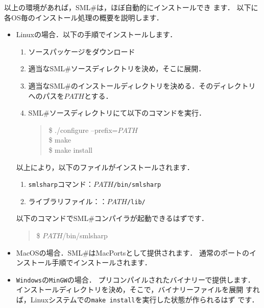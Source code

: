\documentclass{jbook}
\newcommand{\smlsharp}{SML\#}
\newenvironment{program}{\begin{tt}\begin{quote}}{\end{quote}\end{tt}}
\begin{document}
	以上の環境があれば，\smlsharp{}は，ほぼ自動的にインストールでき
ます．
	以下に各OS毎のインストール処理の概要を説明します．
\begin{itemize}
\item Linuxの場合．以下の手順でインストールします．
\begin{enumerate}
\item ソースパッケージをダウンロード
\item 適当な\smlsharp{}ソースディレクトリを決め，そこに展開．
\item 適当な\smlsharp{}のインストールディレクトリを決める．そのディレクトリへのパスを$PATH$とする．
\item \smlsharp{}ソースディレクトリにて以下のコマンドを実行．
\begin{program}
\$ ./configure --prefix=$PATH$\\
\$ make\\
\$ make install
\end{program}
\end{enumerate}
以上により，以下のファイルがインストールされます．
\begin{enumerate}
\item {\tt smlsharp}コマンド：{\tt $PATH$/bin/smlsharp}
\item ライブラリファイル：：{\tt $PATH$/lib/}
\end{enumerate}
以下のコマンドで\smlsharp{}コンパイラが起動できるはずです．
\begin{program}
\$ $PATH$/bin/smlsharp
\end{program}

\item MacOSの場合．\smlsharp{}はMacPortsとして提供されます．
通常のポートのインストール手順でインストールされます．

\item {\tt Windows}の{\tt MinGW}の場合．
	プリコンパイルされたバイナリーで提供します．
	インストールディレクトリを決め，そこで，バイナリーファイルを展開
すれば，Linuxシステムでの{\tt make install}を実行した状態が作られるはず
です．
\end{itemize}





	
\end{document}
